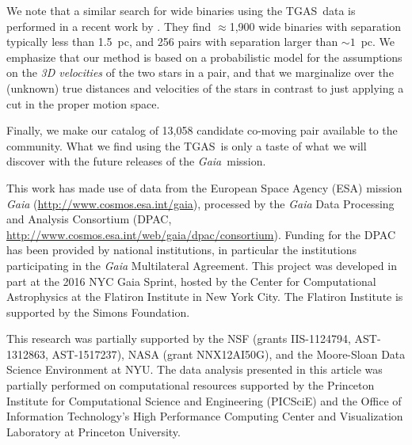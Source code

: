 \documentclass[manuscript, letterpaper]{aastex6}
\newcommand{\project}[1]{\textsl{#1}}
\newcommand{\acronym}[1]{{\small{#1}}}
\newcommand{\gaia}{\project{Gaia}}
\newcommand{\tgas}{\acronym{TGAS}}
\begin{document}
We note that a similar search for wide binaries using the \tgas\ data is performed
in a recent work by \citet{2016arXiv161107883O}. They find $\approx$1,900 wide binaries
with separation typically less than 1.5~pc, and 256 pairs with separation larger than
$\sim 1$~pc.
We emphasize that our method is based on a probabilistic model for the assumptions
on the \emph{3D velocities} of the two stars in a pair, and that we
marginalize over the (unknown) true distances and velocities of the stars
in contrast to just applying a cut in the proper motion space.

Finally, we make our catalog of 13,058 candidate co-moving pair available to the
community.
What we find using the \tgas\ is only a taste of what we will discover with
the future releases of the \gaia\ mission.


\acknowledgements

This work has made use of data from the European Space Agency (ESA) mission
{\it Gaia} (\url{http://www.cosmos.esa.int/gaia}), processed by the {\it Gaia}
Data Processing and Analysis Consortium (DPAC,
\url{http://www.cosmos.esa.int/web/gaia/dpac/consortium}). Funding for the DPAC
has been provided by national institutions, in particular the institutions
participating in the {\it Gaia} Multilateral Agreement. This project was
developed in part at the 2016 NYC Gaia Sprint, hosted by the Center for
Computational Astrophysics at the Flatiron Institute in New York City. The
Flatiron Institute is supported by the Simons Foundation.

This research was partially supported by the \acronym{NSF} (grants
  \acronym{IIS-1124794}, \acronym{AST-1312863}, \acronym{AST-1517237}),
  \acronym{NASA} (grant \acronym{NNX12AI50G}),
  and the Moore-Sloan Data Science Environment at \acronym{NYU}. The data
analysis presented in this article was partially performed on computational
resources supported by the Princeton Institute for Computational Science and
Engineering (PICSciE) and the Office of Information Technology's High
Performance Computing Center and Visualization Laboratory at Princeton
University.

\end{document}
